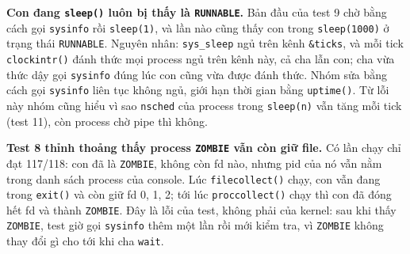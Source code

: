 \item \textbf{Con đang \texttt{sleep()} luôn bị thấy là \texttt{RUNNABLE}.} Bản đầu của test 9 chờ bằng cách gọi \texttt{sysinfo} rồi \texttt{sleep(1)}, và lần nào cũng thấy con trong \texttt{sleep(1000)} ở trạng thái \texttt{RUNNABLE}. Nguyên nhân: \texttt{sys\_sleep} ngủ trên kênh \texttt{\&ticks}, và mỗi tick \texttt{clockintr()} đánh thức mọi process ngủ trên kênh này, cả cha lẫn con; cha vừa thức dậy gọi \texttt{sysinfo} đúng lúc con cũng vừa được đánh thức. Nhóm sửa bằng cách gọi \texttt{sysinfo} liên tục không ngủ, giới hạn thời gian bằng \texttt{uptime()}. Từ lỗi này nhóm cũng hiểu vì sao \texttt{nsched} của process trong \texttt{sleep(n)} vẫn tăng mỗi tick (test 11), còn process chờ pipe thì không.

\item \textbf{Test 8 thỉnh thoảng thấy process \texttt{ZOMBIE} vẫn còn giữ file.} Có lần chạy chỉ đạt 117/118: con đã là \texttt{ZOMBIE}, không còn fd nào, nhưng pid của nó vẫn nằm trong danh sách process của console. Lúc \texttt{filecollect()} chạy, con vẫn đang trong \texttt{exit()} và còn giữ fd 0, 1, 2; tới lúc \texttt{proccollect()} chạy thì con đã đóng hết fd và thành \texttt{ZOMBIE}. Đây là lỗi của test, không phải của kernel: sau khi thấy \texttt{ZOMBIE}, test giờ gọi \texttt{sysinfo} thêm một lần rồi mới kiểm tra, vì \texttt{ZOMBIE} không thay đổi gì cho tới khi cha \texttt{wait}.
